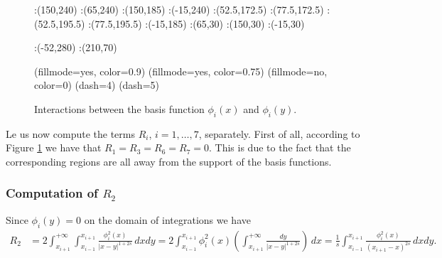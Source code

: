 {\begin{figure}
:(150,240) :(65,240) :(150,185) 
:(-15,240) :(52.5,172.5) :(77.5,172.5) 
:(52.5,195.5) :(77.5,195.5) :(-15,185) 
:(65,30) :(150,30) :(-15,30) 

:(-52,280) :(210,70)


\figdrawbegin{}

\figset(fillmode=yes, color=0.9)
\figdrawline[29,30,10,6,29]
\figdrawline[30,32,12,16,30]
\figdrawline[32,31,5,9,32]
\figdrawline[31,11,15,29,31]
\figset(fillmode=yes, color=0.75)
\figdrawline[29,30,32,31,29]
\figset(fillmode=no, color=0)
\figdrawarrow[1,2]
\figdrawarrow[3,4]
\figdrawline[5,6]
\figdrawline[9,10]
\figdrawline[11,12]
\figdrawline[15,16]
\figset(dash=4)
\figdrawline[7,56]
\figdrawline[57,55]
\figdrawline[53,8]
\figdrawline[13,59]
\figdrawline[60,61]
\figdrawline[62,14]
\figset(dash=5)
\figdrawline[33,34]
\figdrawend

\centerline{\box\figBoxA}
\caption{Interactions between the basis function $\phi_i(x)$ and $\phi_i(y)$.}\label{dia}
\end{figure}

Le us now compute the terms $R_i$, $i=1,\ldots,7$, separately. First of all, according to Figure \ref{dia} we have that $R_1=R_3=R_6=R_7=0.$ This is due to the fact that the corresponding regions are all away from the support of the basis functions. 
\subsubsection*{Computation of $R_2$}
Since $\phi_i(y) = 0$ on the domain of integrations we have
\begin{align*}
	R_2 &= 2\int_{x_{i+1}}^{+\infty}\int_{x_{i-1}}^{x_{i+1}} \frac{\phi_i^2(x)}{|x-y|^{1+2s}}\,dxdy = 2\int_{x_{i-1}}^{x_{i+1}}\phi_i^2(x)\left(\int_{x_{i+1}}^{+\infty} \frac{dy}{|x-y|^{1+2s}}\right)\,dx = \frac{1}{s}\int_{x_{i-1}}^{x_{i+1}}\frac{\phi_i^2(x)}{(x_{i+1}-x)^{2s}}\,dxdy.
\end{align*}

}
